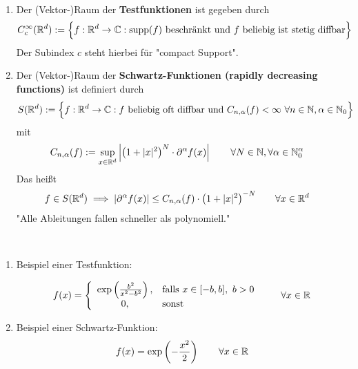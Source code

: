 \begin{defi}\
\begin{enumerate}[label=(\alph*)]
\item Der (Vektor-)Raum der \textbf{Testfunktionen} ist gegeben durch
\begin{align*}
C_c^\infty(\mathbb{R}^d):=\Big\lbrace f:\mathbb{R}^d\to\mathbb{C}:\operatorname{supp}(f)\text{ beschränkt und $f$ beliebig ist stetig diffbar}\Big\rbrace
\end{align*}
Der Subindex $c$ steht hierbei für "compact Support".
\item Der (Vektor-)Raum der \textbf{Schwartz-Funktionen (rapidly decreasing functions)} ist definiert durch
\begin{align*}
	S(\mathbb{R}^d)&:=\Big\lbrace f:\mathbb{R}^d\to\mathbb{C}: f\text{ beliebig oft diffbar und }C_{n,\alpha}(f)<\infty~\forall n\in\mathbb{N},\alpha\in\mathbb{N}_0\Big\rbrace
\end{align*}
mit
\begin{align*}
C_{n,\alpha}(f)&:=\sup\limits_{x\in\mathbb{R}^d}\left|\left(1+|x|^2\right)^N\cdot\partial^\alpha f(x)\right|\qquad\forall N\in\mathbb{N},\forall\alpha\in\mathbb{N}_0^\alpha
\end{align*}
Das heißt
\begin{align*}
f\in S(\mathbb{R}^d) &\implies\left|\partial^\alpha f(x)\right|\leq C_{n,\alpha}(f)\cdot\big(1+|x|^2\big)^{-N}\qquad\forall x\in\mathbb{R}^d
\end{align*}
"Alle Ableitungen fallen schneller als polynomiell."
\end{enumerate}
\end{defi}

\begin{beisp}\
\begin{enumerate}
\item Beispiel einer Testfunktion:

\begin{align*}
f(x)=\left\lbrace\begin{array}{cl}
\exp\left(\frac{b^2}{x^2-b^2}\right), &\text{falls } x\in[-b,b],~b>0\\
0, &\text{sonst }
\end{array}\right.\qquad\forall x\in\mathbb{R}
\end{align*}
\item Beispiel einer Schwartz-Funktion:
\begin{align*}
f(x)=\exp\left(-\frac{x^2}{2}\right)\qquad\forall x\in\mathbb{R}
\end{align*}
\end{enumerate}
\end{beisp}

